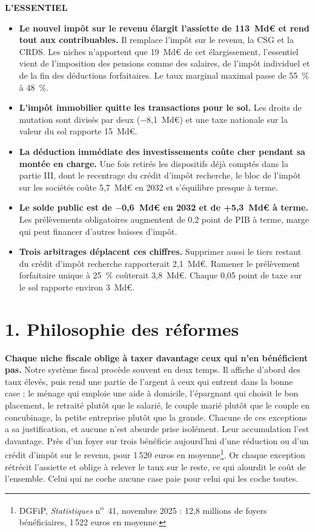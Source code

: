 \begin{enbref}
{\bfseries\color{bleu}L'ESSENTIEL}\par\vspace{3pt}
\begin{itemize}[leftmargin=12pt,itemsep=2pt,topsep=0pt]
\item \textbf{Le nouvel impôt sur le revenu élargit l'assiette de 113~Md€ et rend tout aux contribuables.} Il remplace
l'impôt sur le revenu, la CSG et la CRDS. Les niches n'apportent que 19~Md€ de cet élargissement, l'essentiel vient de
l'imposition des pensions comme des salaires, de l'impôt individuel et de la fin des déductions forfaitaires. Le taux
marginal maximal passe de 55~\% à 48~\%.
\item \textbf{L'impôt immobilier quitte les transactions pour le sol.} Les droits de mutation sont divisés par deux
($-$8,1~Md€) et une taxe nationale sur la valeur du sol rapporte 15~Md€.
\item \textbf{La déduction immédiate des investissements coûte cher pendant sa montée en charge.} Une fois retirés les
dispositifs déjà comptés dans la partie III, dont le recentrage du crédit d'impôt recherche, le bloc de l'impôt sur les
sociétés coûte 5,7~Md€ en 2032 et s'équilibre presque à terme.
\item \textbf{Le solde public est de $-$0,6~Md€ en 2032 et de +5,3~Md€ à terme.} Les prélèvements obligatoires
augmentent de 0,2 point de PIB à terme, marge qui peut financer d'autres baisses d'impôt.
\item \textbf{Trois arbitrages déplacent ces chiffres.} Supprimer aussi le tiers restant du crédit d'impôt recherche
rapporterait 2,1~Md€. Ramener le prélèvement forfaitaire unique à 25~\% coûterait 3,8~Md€. Chaque 0,05 point de taxe sur
le sol rapporte environ 3~Md€.
\end{itemize}
\end{enbref}

\section{1. Philosophie des réformes}

\textbf{Chaque niche fiscale oblige à taxer davantage ceux qui n'en bénéficient pas.} Notre système fiscal procède
souvent en deux temps. Il affiche d'abord des taux élevés, puis rend une partie de l'argent à ceux qui entrent dans la
bonne case : le ménage qui emploie une aide à domicile, l'épargnant qui choisit le bon placement, le retraité plutôt que
le salarié, le couple marié plutôt que le couple en concubinage, la petite entreprise plutôt que la grande. Chacune de
ces exceptions a sa justification, et aucune n'est absurde prise isolément. Leur accumulation l'est davantage. Près
d'un foyer sur trois bénéficie aujourd'hui d'une réduction ou d'un crédit d'impôt sur le revenu, pour 1\,520 euros en
moyenne\footnote{DGFiP, \emph{Statistiques} n\textsuperscript{o}~41, novembre 2025 : 12,8 millions de foyers bénéficiaires, 1\,522 euros en moyenne.}. Or chaque exception rétrécit l'assiette et
oblige à relever le taux sur le reste, ce qui alourdit le coût de l'ensemble. Celui qui ne coche aucune case paie pour
celui qui les coche toutes.

